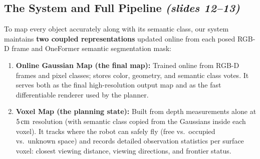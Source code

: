 \documentclass[11pt,a4paper]{article}
\theoremstyle{definition}
\theoremstyle{plain}
\theoremstyle{remark}
\begin{document}
\subsection{The System and Full Pipeline \emph{(slides 12--13)}}

To map every object accurately along with its semantic class, our system maintains \textbf{two coupled representations} updated online from each posed RGB-D frame and OneFormer semantic segmentation mask:
\begin{enumerate}[leftmargin=*]
    \item \textbf{Online Gaussian Map (the final map):} Trained online from RGB-D frames and pixel classes; stores color, geometry, and semantic class votes. It serves both as the final high-resolution output map and as the fast differentiable renderer used by the planner.
    \item \textbf{Voxel Map (the planning state):} Built from depth measurements alone at $5\text{\,cm}$ resolution (with semantic class copied from the Gaussians inside each voxel). It tracks where the robot can safely fly (free vs.\ occupied vs.\ unknown space) and records detailed observation statistics per surface voxel: closest viewing distance, viewing directions, and frontier status.
\end{enumerate}
\end{document}
